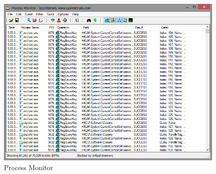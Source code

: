\begin{figure}[h]
  \centering
  \caption{Process Monitor}
  \label{fig:processmon}
  \includegraphics[scale=0.5]{images/processmon.png}
\end{figure}



